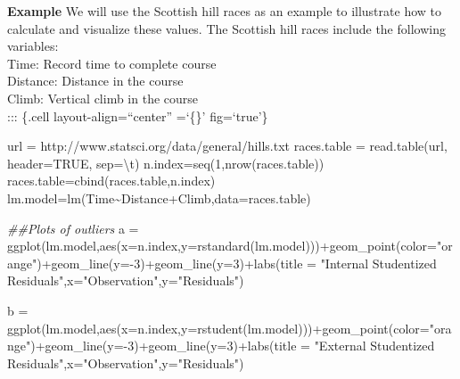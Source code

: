 \documentclass[
  letterpaper,
  DIV=11,
  numbers=noendperiod]{scrreprt}
\newenvironment{Shaded}{\begin{snugshade}}{\end{snugshade}}
\newcommand{\AttributeTok}[1]{\textcolor[rgb]{0.40,0.45,0.13}{#1}}
\newcommand{\ConstantTok}[1]{\textcolor[rgb]{0.56,0.35,0.01}{#1}}
\newcommand{\DecValTok}[1]{\textcolor[rgb]{0.68,0.00,0.00}{#1}}
\newcommand{\DocumentationTok}[1]{\textcolor[rgb]{0.37,0.37,0.37}{\textit{#1}}}
\newcommand{\FunctionTok}[1]{\textcolor[rgb]{0.28,0.35,0.67}{#1}}
\newcommand{\NormalTok}[1]{\textcolor[rgb]{0.00,0.23,0.31}{#1}}
\newcommand{\OtherTok}[1]{\textcolor[rgb]{0.00,0.23,0.31}{#1}}
\newcommand{\SpecialCharTok}[1]{\textcolor[rgb]{0.37,0.37,0.37}{#1}}
\newcommand{\StringTok}[1]{\textcolor[rgb]{0.13,0.47,0.30}{#1}}
\begin{document}
\textbf{Example} We will use the Scottish hill races as an example to
illustrate how to calculate and visualize these values. The Scottish
hill races include the following variables:\\
Time: Record time to complete course\\
Distance: Distance in the course\\
Climb: Vertical climb in the course\\

::: \{.cell layout-align=``center'' =`\{\}' fig=`true'\}

\begin{Shaded}
\begin{Highlighting}[]
\NormalTok{url }\OtherTok{=} \StringTok{\textquotesingle{}http://www.statsci.org/data/general/hills.txt\textquotesingle{}} 
\NormalTok{races.table }\OtherTok{=} \FunctionTok{read.table}\NormalTok{(url, }\AttributeTok{header=}\ConstantTok{TRUE}\NormalTok{, }\AttributeTok{sep=}\StringTok{\textquotesingle{}}\SpecialCharTok{\textbackslash{}t}\StringTok{\textquotesingle{}}\NormalTok{)}
\NormalTok{n.index}\OtherTok{=}\FunctionTok{seq}\NormalTok{(}\DecValTok{1}\NormalTok{,}\FunctionTok{nrow}\NormalTok{(races.table))}
\NormalTok{races.table}\OtherTok{=}\FunctionTok{cbind}\NormalTok{(races.table,n.index)}
\NormalTok{lm.model}\OtherTok{=}\FunctionTok{lm}\NormalTok{(Time}\SpecialCharTok{\textasciitilde{}}\NormalTok{Distance}\SpecialCharTok{+}\NormalTok{Climb,}\AttributeTok{data=}\NormalTok{races.table)}


\DocumentationTok{\#\#Plots of outliers}
\NormalTok{a }\OtherTok{=} \FunctionTok{ggplot}\NormalTok{(lm.model,}\FunctionTok{aes}\NormalTok{(}\AttributeTok{x=}\NormalTok{n.index,}\AttributeTok{y=}\FunctionTok{rstandard}\NormalTok{(lm.model)))}\SpecialCharTok{+}\FunctionTok{geom\_point}\NormalTok{(}\AttributeTok{color=}\StringTok{"orange"}\NormalTok{)}\SpecialCharTok{+}\FunctionTok{geom\_line}\NormalTok{(}\AttributeTok{y=}\SpecialCharTok{{-}}\DecValTok{3}\NormalTok{)}\SpecialCharTok{+}\FunctionTok{geom\_line}\NormalTok{(}\AttributeTok{y=}\DecValTok{3}\NormalTok{)}\SpecialCharTok{+}\FunctionTok{labs}\NormalTok{(}\AttributeTok{title =} \StringTok{"Internal Studentized Residuals"}\NormalTok{,}\AttributeTok{x=}\StringTok{"Observation"}\NormalTok{,}\AttributeTok{y=}\StringTok{"Residuals"}\NormalTok{)}

\NormalTok{b }\OtherTok{=} \FunctionTok{ggplot}\NormalTok{(lm.model,}\FunctionTok{aes}\NormalTok{(}\AttributeTok{x=}\NormalTok{n.index,}\AttributeTok{y=}\FunctionTok{rstudent}\NormalTok{(lm.model)))}\SpecialCharTok{+}\FunctionTok{geom\_point}\NormalTok{(}\AttributeTok{color=}\StringTok{"orange"}\NormalTok{)}\SpecialCharTok{+}\FunctionTok{geom\_line}\NormalTok{(}\AttributeTok{y=}\SpecialCharTok{{-}}\DecValTok{3}\NormalTok{)}\SpecialCharTok{+}\FunctionTok{geom\_line}\NormalTok{(}\AttributeTok{y=}\DecValTok{3}\NormalTok{)}\SpecialCharTok{+}\FunctionTok{labs}\NormalTok{(}\AttributeTok{title =} \StringTok{"External Studentized Residuals"}\NormalTok{,}\AttributeTok{x=}\StringTok{"Observation"}\NormalTok{,}\AttributeTok{y=}\StringTok{"Residuals"}\NormalTok{)}


\end{Highlighting}
\end{Shaded}
\end{document}
